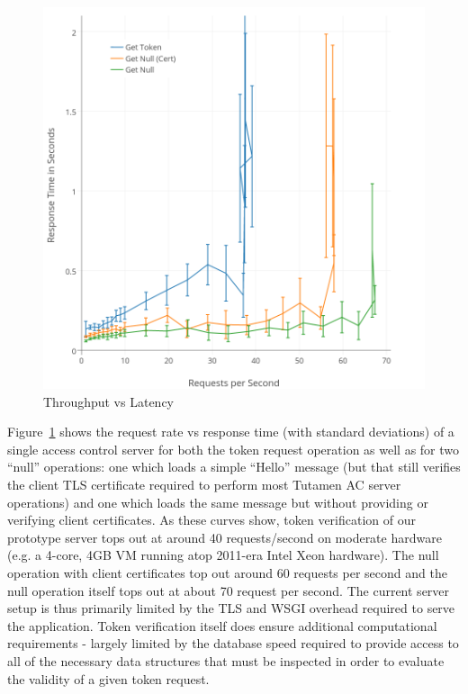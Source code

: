\begin{figure}[th]
  \centering
  \includegraphics[width=\columnwidth]{./figs/png/chart-iops.png}
  \caption{Throughput vs Latency}
  \label{fig:eval:iops}
\end{figure}

Figure~\ref{fig:eval:iops} shows the request rate vs response time
(with standard deviations) of a single access control server for both
the token request operation as well as for two ``null'' operations:
one which loads a simple ``Hello'' message (but that still verifies
the client TLS certificate required to perform most Tutamen AC server
operations) and one which loads the same message but without providing
or verifying client certificates. As these curves show, token
verification of our prototype server tops out at around 40
requests/second on moderate hardware (e.g. a 4-core, 4GB VM running
atop 2011-era Intel Xeon hardware). The null operation with client
certificates top out around 60 requests per second and the null
operation itself tops out at about 70 request per second. The current
server setup is thus primarily limited by the TLS and WSGI overhead
required to serve the application. Token verification itself does
ensure additional computational requirements - largely limited by the
database speed required to provide access to all of the necessary data
structures that must be inspected in order to evaluate the validity of
a given token request.

